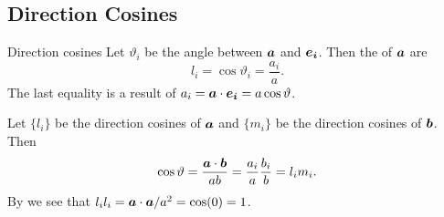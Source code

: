 \subsection{Direction Cosines}
\begin{definition}{Direction cosines}{}
    Let \(\vartheta_i\) be the angle between \(\bm{a}\) and \(\bm{e_{i}}\).
    Then the  of \(\bm{a}\) are
    \[l_i = \cos\vartheta_i = \frac{a_i}{a}.\]
    The last equality is a result of \(a_i = \bm{a}\cdot\bm{e_{i}} = a\cos\vartheta\).
\end{definition}
Let \(\{l_i\}\) be the direction cosines of \(\bm{a}\) and \(\{m_i\}\) be the direction cosines of \(\bm{b}\).
Then
\[\cos\vartheta = \frac{\bm{a}\cdot\bm{b}}{ab} = \frac{a_i}{a}\frac{b_i}{b} = l_im_i.\]
By we see that \(l_il_i = \bm{a}\cdot\bm{a} / a^2 = \cos(0) = 1\).

